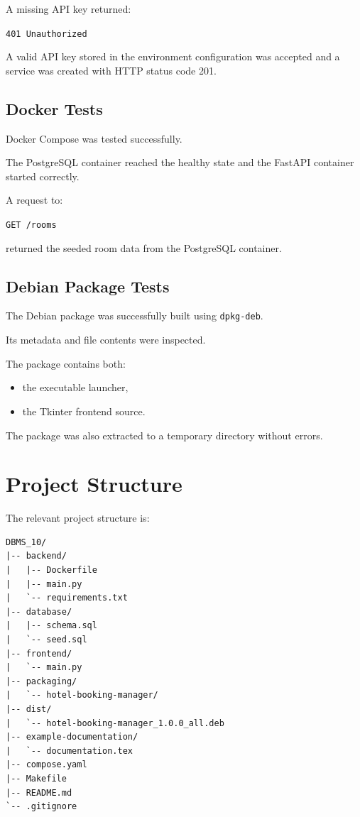\documentclass[12pt,a4paper]{article}
\begin{document}
A missing API key returned:

\begin{center}
\texttt{401 Unauthorized}
\end{center}

A valid API key stored in the environment configuration was accepted and
a service was created with HTTP status code 201.

\subsection{Docker Tests}

Docker Compose was tested successfully.

The PostgreSQL container reached the healthy state and the FastAPI
container started correctly.

A request to:

\begin{center}
\texttt{GET /rooms}
\end{center}

returned the seeded room data from the PostgreSQL container.

\subsection{Debian Package Tests}

The Debian package was successfully built using \texttt{dpkg-deb}.

Its metadata and file contents were inspected.

The package contains both:

\begin{itemize}
    \item the executable launcher,
    \item the Tkinter frontend source.
\end{itemize}

The package was also extracted to a temporary directory without errors.

\section{Project Structure}

The relevant project structure is:

\begin{lstlisting}
DBMS_10/
|-- backend/
|   |-- Dockerfile
|   |-- main.py
|   `-- requirements.txt
|-- database/
|   |-- schema.sql
|   `-- seed.sql
|-- frontend/
|   `-- main.py
|-- packaging/
|   `-- hotel-booking-manager/
|-- dist/
|   `-- hotel-booking-manager_1.0.0_all.deb
|-- example-documentation/
|   `-- documentation.tex
|-- compose.yaml
|-- Makefile
|-- README.md
`-- .gitignore
\end{lstlisting}
\end{document}
